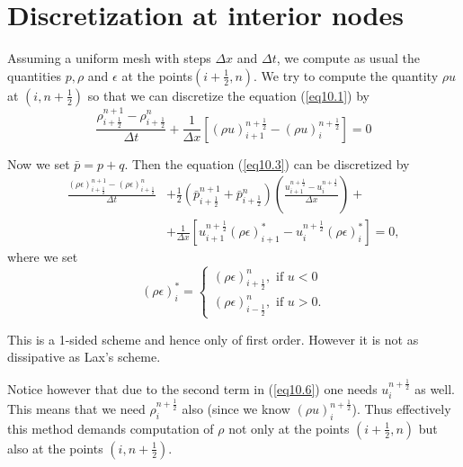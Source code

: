 \section{Discretization at interior nodes}\label{chap10:sec10.2}

Assuming a uniform mesh with steps $\Delta x$ and $\Delta t$, we
compute as usual the quantities $p, \rho$ and $\epsilon$ at the
points\pageoriginale $(i+ \frac{1}{2}, n)$. We try to compute the
quantity $\rho u$ at $(i, n + \frac{1}{2})$ so that we can discretize
the equation (\ref{eq10.1}) by 
\begin{equation*}
\frac{\rho^{n+1}_{i+\frac{1}{2}} - \rho^n_{i+\frac{1}{2}}}{\Delta t} +
\frac{1}{\Delta x} \left[ (\rho u)^{n+\frac{1}{2}}_{i+1} - (\rho
  u)^{n+\frac{1}{2}}_i \right] =0 
\tag{10.5}\label{eq10.5}
\end{equation*}

Now we set $\bar{p} = p + q$. Then the equation (\ref{eq10.3}) can be discretized by
\begin{align*}
\frac{(\rho\epsilon)^{n+1}_{i+\frac{1}{2}} - (\rho
  \epsilon)^n_{i+\frac{1}{2}}}{\Delta t} & + \frac{1}{2}
\left(\bar{p}^{n+1}_{i+\frac{1}{2}} + \bar{p}^n_{i+\frac{1}{2}}\right)
\left(\frac{u^{n+\frac{1}{2}}_{i+1} - u^{n+\frac{1}{2}}_{i}}{\Delta x}\right)
+\\ 
& + \frac{1}{\Delta x} \left[ u^{n+\frac{1}{2}}_{i+1} (\rho \epsilon)^*_{i+1} - u^{n+\frac{1}{2}}_i (\rho \epsilon)^*_i\right] = 0,\tag{10.6}\label{eq10.6}
\end{align*}
where we set 
\begin{equation*}
(\rho \epsilon)^*_i = 
\begin{cases}
(\rho \epsilon)^n_{i+\frac{1}{2}}, \text{ if } u < 0\\
(\rho \epsilon)^n_{i-\frac{1}{2}}, \text{ if } u > 0. 
\end{cases}\tag{10.7}\label{eq10.7}
\end{equation*}

This is a 1-sided scheme and hence only of first order. However it is not as dissipative as Lax's scheme.

Notice however that due to the second term in (\ref{eq10.6}) one needs $u^{n+\frac{1}{2}}_i$ as well. This means that we need $\rho^{n+\frac{1}{2}}_i$ also (since we know $(\rho u)^{n+\frac{1}{2}}_i$). Thus effectively this method demands computation of $\rho$ not only at the points $(i+\frac{1}{2}, n)$ but also at the points $(i, n+ \frac{1}{2})$.

